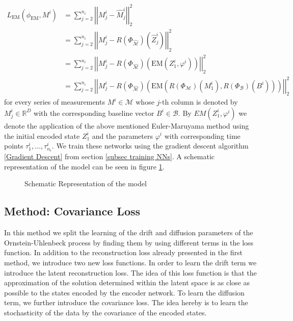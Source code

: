 \documentclass[11pt,titlepage]{article}
\newcommand{\R}{\mathbb{R}} %
\newcommand{\abs}[1]{{\left| #1 \right|}}
\theoremstyle{definition}
\theoremstyle{remark}
\begin{document}
	\begin{align*}
		L_{\mathrm{EM}}(\phi_\mathrm{EM}, M^i) &= \sum_{j=2}^{n_i} \abs{\abs{M^i_j- \hat{M}^i_j}}_2^2\\
		&= \sum_{j=2}^{n_i} \abs{\abs{M^i_j- R(\Phi_{\hat{\mathcal{M}}})(\hat{Z}^i_j)}}_2^2\\
		&= \sum_{j=2}^{n_i} \abs{\abs{M^i_j- R(\Phi_{\hat{\mathcal{M}}})(\mathrm{EM}(Z^i_1, \varphi^i))}}_2^2\\
		&= \sum_{j=2}^{n_i} \abs{\abs{M^i_j- R(\Phi_{\hat{\mathcal{M}}})(\mathrm{EM}(R(\Phi_\mathcal{M})(M^i_1), R(\Phi_\mathcal{B})(B^i)))}}_2^2
	\end{align*}
	for every series of measurements $M^i\in \mathcal{M}$ whose $j$-th column is denoted by $M^i_j\in\R^D$ with the corresponding baseline vector $B^i\in\mathcal{B}$. By $EM(Z^i_1, \varphi^i)$ we denote the application of the above mentioned Euler-Maruyama method using the initial encoded state $Z^i_1$ and the parameters $\varphi^i$ with corresponding time points $\tau^i_1, \ldots,\tau^i_{n_i}$.
	We train these networks using the gradient descent algorithm \ref{Gradient Descent} from section \ref{subsec training NNs}. 
	A schematic representation of the model can be seen in figure \ref{Abb Euler Mar method}.
	
	
	\begin{figure}[!h]
		\caption{Schematic Representation of the model}
		\label{Abb Euler Mar method}
	\end{figure}
	
	\subsection{Method: Covariance Loss}\label{sec cov loss}
	
	In this method we split the learning of the drift and diffusion parameters of the Ornstein-Uhlenbeck process by finding them by using different terms in the loss function. In addition to the reconstruction loss already presented in the first method, we introduce two new loss functions. In order to learn the drift term we introduce the latent reconstruction loss. The idea of this loss function is that the approximation of the solution determined within the latent space is as close as possible to the states encoded by the encoder network. To learn the diffusion term, we further introduce the covariance loss. The idea hereby is to learn the stochasticity of the data by the covariance of the encoded states.\\
\end{document}
